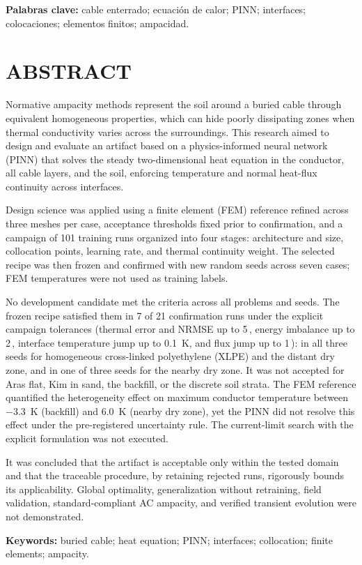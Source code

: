 \noindent\textbf{Palabras clave:} cable enterrado; ecuación de calor; PINN; interfaces; colocaciones; elementos finitos; ampacidad.

\chapter*{ABSTRACT}

Normative ampacity methods represent the soil around a buried cable through equivalent homogeneous properties, which can hide poorly dissipating zones when thermal conductivity varies across the surroundings. This research aimed to design and evaluate an artifact based on a physics-informed neural network (PINN) that solves the steady two-dimensional heat equation in the conductor, all cable layers, and the soil, enforcing temperature and normal heat-flux continuity across interfaces.

Design science was applied using a finite element (FEM) reference refined across three meshes per case, acceptance thresholds fixed prior to confirmation, and a campaign of 101 training runs organized into four stages: architecture and size, collocation points, learning rate, and thermal continuity weight. The selected recipe was then frozen and confirmed with new random seeds across seven cases; FEM temperatures were not used as training labels.

No development candidate met the criteria across all problems and seeds. The frozen recipe satisfied them in 7 of 21 confirmation runs under the explicit campaign tolerances (thermal error and NRMSE up to 5\,\pct{}, energy imbalance up to 2\,\pct{}, interface temperature jump up to \SI{0.1}{\kelvin}, and flux jump up to 1\,\pct{}): in all three seeds for homogeneous cross-linked polyethylene (XLPE) and the distant dry zone, and in one of three seeds for the nearby dry zone. It was not accepted for Aras flat, Kim in sand, the backfill, or the discrete soil strata. The FEM reference quantified the heterogeneity effect on maximum conductor temperature between \SI{-3.3}{\kelvin} (backfill) and \SI{+6.0}{\kelvin} (nearby dry zone), yet the PINN did not resolve this effect under the pre-registered uncertainty rule. The current-limit search with the explicit formulation was not executed.

It was concluded that the artifact is acceptable only within the tested domain and that the traceable procedure, by retaining rejected runs, rigorously bounds its applicability. Global optimality, generalization without retraining, field validation, standard-compliant AC ampacity, and verified transient evolution were not demonstrated.

\noindent\textbf{Keywords:} buried cable; heat equation; PINN; interfaces; collocation; finite elements; ampacity.
